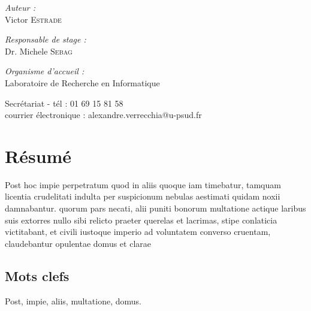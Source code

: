 \documentclass[oneside]{memoir}
\begin{document}
\begin{titlingpage}
\begin{center}
\begin{minipage}{0.4\textwidth}
\begin{flushleft} \large
\emph{Auteur :}\\
Victor \textsc{Estrade}
\end{flushleft}
\end{minipage}
\begin{minipage}{0.4\textwidth}
\begin{flushright} \large
\emph{Responsable de stage :} \\
Dr. Michele \textsc{Sebag}
\end{flushright}
\end{minipage}
\vfill
\emph{Organisme d'accueil : }\\
Laboratoire de Recherche en Informatique

 
\vfill


 
{Secrétariat - tél : 01 69 15 81 58\\
courrier électronique : alexandre.verrecchia@u-psud.fr\\
} 
\end{center}
 
\end{titlingpage}



\tableofcontents

\newpage
\thispagestyle{empty}%
\newpage


\chapter*{Résumé}

Post hoc impie perpetratum quod in aliis quoque iam timebatur, tamquam
licentia crudelitati indulta per suspicionum nebulas aestimati quidam
noxii damnabantur. quorum pars necati, alii puniti bonorum multatione
actique laribus suis extorres nullo sibi relicto praeter querelas et
lacrimas, stipe conlaticia victitabant, et civili iustoque imperio ad
voluntatem converso cruentam, claudebantur opulentae domus et
clarae~\cite{Ganin2016}

\section*{Mots clefs}
Post, impie, aliis, multatione, domus.
\end{document}
